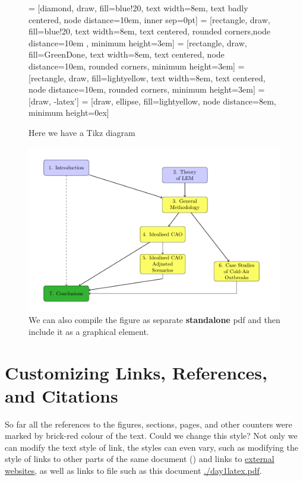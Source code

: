 \documentclass[a4paper,10pt]{report} %
\begin{document}
 \begin{figure}[!h] 
       = [diamond, draw, fill=blue!20, text width=8em, text badly centered, node distance=10em, inner sep=0pt]
       = [rectangle, draw, fill=blue!20, text width=8em, text centered, rounded corners,node distance=10em ,  minimum height=3em]
       = [rectangle, draw, fill=GreenDone, text width=8em, text centered, node distance=10em, rounded corners, minimum height=3em]
       = [rectangle, draw, fill=lightyellow, text width=8em, text centered, node distance=10em, rounded corners, minimum height=3em]
       = [draw, -latex']
       = [draw, ellipse, fill=lightyellow, node distance=8em, minimum height=0ex]

      
   \caption{Here we have a Tikz diagram}
   \label{fig:directly} 
   \end{figure} 
    
   \begin{figure}[!ht]
    \includegraphics[width=\textwidth]{./latex/standalone.pdf}
        \caption[Diagrams and plots]{We can also compile the figure as separate \textbf{standalone}  pdf and then include it as a graphical element. }  
      \label{fig:standalone}
 \end{figure}

 \newpage 
 
 \section{Customizing Links, References, and Citations}
 So far all the references to the figures, sections, pages, and other counters were marked by brick-red colour of the text. Could we change this style? Not only we can modify the text style of link, the styles can even vary, such as modifying the style of links to other parts of the same document () and links to \href{https://geomet.uni-koeln.de/en/}{external websites}, as well as links to file such as this document \href{./day1latex.pdf}{./day1latex.pdf}.\\
 
\end{document}
